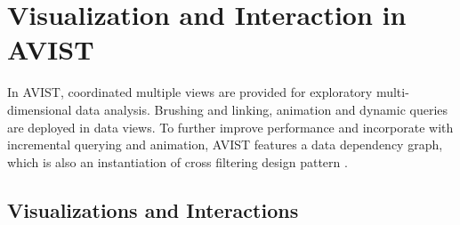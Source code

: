 \documentclass[journal]{vgtc}                %
\begin{document}
{%
 












\section{Visualization and Interaction in AVIST}

In AVIST, coordinated multiple views are provided for exploratory multi-dimensional data analysis. Brushing and linking, animation and dynamic queries are deployed in data views. To further improve performance and incorporate with incremental querying and animation, AVIST features a data dependency graph, which is also an instantiation of cross filtering design pattern \cite{weaver2010cross}.  


\subsection{Visualizations and Interactions}

}
\end{document}
